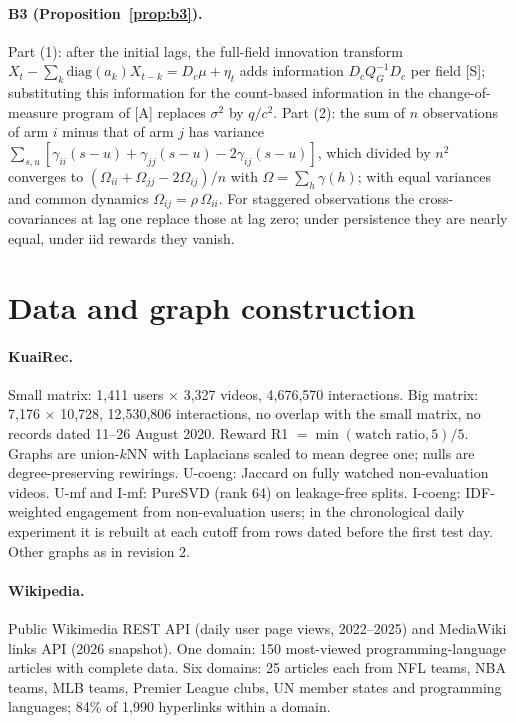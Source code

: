 \documentclass[11pt]{article}
\theoremstyle{definition}
\theoremstyle{remark}
\newcommand{\src}[1]{\textsf{[#1]}}
\begin{document}
\paragraph{B3 (Proposition~\ref{prop:b3}).} Part (1): after the initial lags, the full-field innovation transform $X_t-\sum_k\mathrm{diag}(a_k)X_{t-k}=D_c\mu+\eta_t$ adds information $D_cQ_G^{-1}D_c$ per field \src{S}; substituting this information for the count-based information in the change-of-measure program of \src{A} replaces $\sigma^2$ by $q/c^2$. Part (2): the sum of $n$ observations of arm $i$ minus that of arm $j$ has variance $\sum_{s,u}[\gamma_{ii}(s-u)+\gamma_{jj}(s-u)-2\gamma_{ij}(s-u)]$, which divided by $n^2$ converges to $(\Omega_{ii}+\Omega_{jj}-2\Omega_{ij})/n$ with $\Omega=\sum_h\gamma(h)$; with equal variances and common dynamics $\Omega_{ij}=\rho\,\Omega_{ii}$. For staggered observations the cross-covariances at lag one replace those at lag zero; under persistence they are nearly equal, under iid rewards they vanish.

\section{Data and graph construction}\label{app:data}

\paragraph{KuaiRec.} Small matrix: 1,411 users $\times$ 3,327 videos, 4,676,570 interactions. Big matrix: 7,176 $\times$ 10,728, 12,530,806 interactions, no overlap with the small matrix, no records dated 11--26 August 2020. Reward R1 $=\min(\text{watch ratio},5)/5$. Graphs are union-$k$NN with Laplacians scaled to mean degree one; nulls are degree-preserving rewirings. U-coeng: Jaccard on fully watched non-evaluation videos. U-mf and I-mf: PureSVD (rank 64) on leakage-free splits. I-coeng: IDF-weighted engagement from non-evaluation users; in the chronological daily experiment it is rebuilt at each cutoff from rows dated before the first test day. Other graphs as in revision 2.

\paragraph{Wikipedia.} Public Wikimedia REST API (daily user page views, 2022--2025) and MediaWiki links API (2026 snapshot). One domain: 150 most-viewed programming-language articles with complete data. Six domains: 25 articles each from NFL teams, NBA teams, MLB teams, Premier League clubs, UN member states and programming languages; 84\% of 1,990 hyperlinks within a domain.
\end{document}
